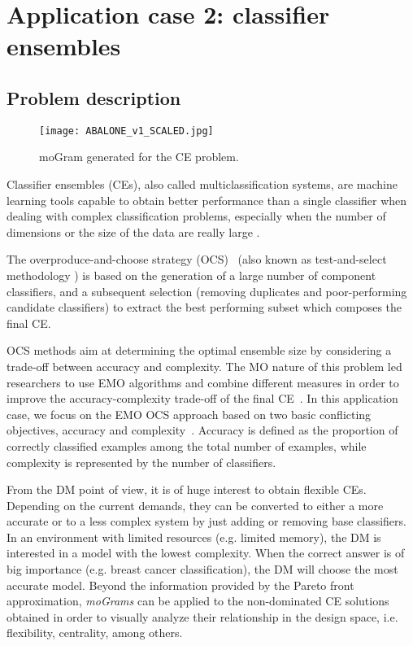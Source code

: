 \documentclass[journal]{IEEEtran}
\begin{document}
\section{Application case 2: classifier ensembles}
\label{sec:appcase2}

\subsection{Problem description}


\begin{figure*}[ht]
 \centering
\texttt{[image: ABALONE\_v1\_SCALED.jpg]}
\caption{moGram generated for the CE problem.}
\label{fig:ensembles1}
\end{figure*}

Classifier ensembles (CEs), also called multiclassification systems, are machine learning tools capable to obtain better performance than a single
classifier when dealing with complex classification problems, especially when the number of dimensions or the size of the data are really large \cite{Kun04}.

The overproduce-and-choose strategy (OCS)~\cite{Partridge96} (also known as test-and-select methodology \cite{Sharkey00}) is based on the generation of a large number of component classifiers, and a subsequent selection (removing duplicates and poor-performing candidate classifiers) to extract the best performing subset which composes the final CE. 

OCS methods aim at determining the optimal ensemble size by considering a trade-off between accuracy and complexity. 
The MO nature of this problem led researchers to use EMO algorithms and combine different measures in order to improve the accuracy-complexity trade-off of the final CE~\cite{Trawinski11,Trawinski2013,Oliveira05,Santos08}. In this application case, we focus on the EMO OCS approach based on two basic conflicting objectives, accuracy and complexity~\cite{Trawinski11}. Accuracy is defined as the proportion of correctly classified examples among the total number of examples, while complexity is represented by the number of classifiers.


From the DM point of view, it is of huge interest to obtain flexible CEs. Depending on the current demands, they can be converted to either a more accurate or to a less complex system by just adding or removing base classifiers. 
In an environment with limited resources (e.g. limited memory), the DM is interested in a model with the lowest complexity. When the correct answer is of big importance (e.g. breast cancer classification), the DM will choose the most accurate model. Beyond the information provided by the Pareto front approximation, \emph{moGrams} can be applied to the non-dominated CE solutions obtained in order to visually analyze their relationship in the design space, i.e. flexibility, centrality, among others.
\end{document}
